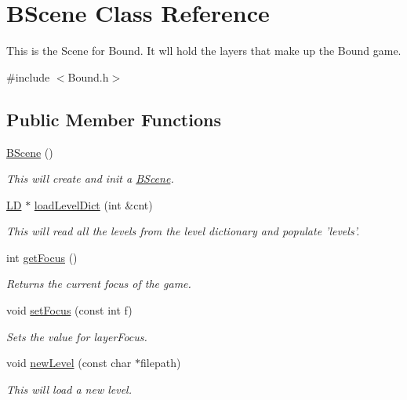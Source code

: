\hypertarget{class_b_scene}{\section{\-B\-Scene \-Class \-Reference}
\label{class_b_scene}
}


\-This is the \-Scene for \-Bound. \-It wll hold the layers that make up the \-Bound game.  




{\ttfamily \#include $<$\-Bound.\-h$>$}

\subsection*{\-Public \-Member \-Functions}
\begin{DoxyCompactItemize}
\item 
\hyperlink{class_b_scene_a814659a27cecfe7e5aefc32081d0f3a5}{\-B\-Scene} ()
\begin{DoxyCompactList}\small\item\em \-This will create and init a \hyperlink{class_b_scene}{\-B\-Scene}. \end{DoxyCompactList}\item 
\hyperlink{struct_l_d}{\-L\-D} $\ast$ \hyperlink{class_b_scene_a717840a63b4399bb70d420ba34cc324d}{load\-Level\-Dict} (int \&cnt)
\begin{DoxyCompactList}\small\item\em \-This will read all the levels from the level dictionary and populate 'levels'. \end{DoxyCompactList}\item 
int \hyperlink{class_b_scene_ae8759c51e7bcd9888f3035cbcd9d675c}{get\-Focus} ()
\begin{DoxyCompactList}\small\item\em \-Returns the current focus of the game. \end{DoxyCompactList}\item 
void \hyperlink{class_b_scene_a71869b30ce6256f90b7873a4ffa4fd12}{set\-Focus} (const int f)
\begin{DoxyCompactList}\small\item\em \-Sets the value for layer\-Focus. \end{DoxyCompactList}\item 
void \hyperlink{class_b_scene_a79117c8d522c8907c474b8448b5e486b}{new\-Level} (const char $\ast$filepath)
\begin{DoxyCompactList}\small\item\em \-This will load a new level. \end{DoxyCompactList}\item 

\end{DoxyCompactItemize}
